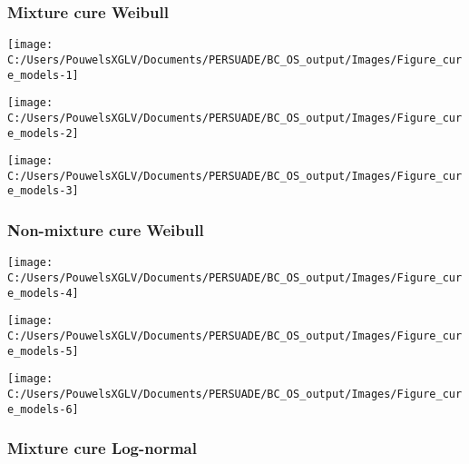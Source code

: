 \documentclass[
]{article}
\begin{document}
\clearpage

\clearpage

\subsubsection{Mixture cure Weibull}\label{mixture-cure-weibull}

\begin{flushleft}\texttt{[image: C:/Users/PouwelsXGLV/Documents/PERSUADE/BC\_OS\_output/Images/Figure\_cure\_models-1]} \end{flushleft}

\begin{flushleft}\texttt{[image: C:/Users/PouwelsXGLV/Documents/PERSUADE/BC\_OS\_output/Images/Figure\_cure\_models-2]} \end{flushleft}

\begin{flushleft}\texttt{[image: C:/Users/PouwelsXGLV/Documents/PERSUADE/BC\_OS\_output/Images/Figure\_cure\_models-3]} \end{flushleft}

\clearpage

\subsubsection{Non-mixture cure Weibull}\label{non-mixture-cure-weibull}

\begin{flushleft}\texttt{[image: C:/Users/PouwelsXGLV/Documents/PERSUADE/BC\_OS\_output/Images/Figure\_cure\_models-4]} \end{flushleft}

\begin{flushleft}\texttt{[image: C:/Users/PouwelsXGLV/Documents/PERSUADE/BC\_OS\_output/Images/Figure\_cure\_models-5]} \end{flushleft}

\begin{flushleft}\texttt{[image: C:/Users/PouwelsXGLV/Documents/PERSUADE/BC\_OS\_output/Images/Figure\_cure\_models-6]} \end{flushleft}

\clearpage

\subsubsection{Mixture cure Log-normal}\label{mixture-cure-log-normal}
\end{document}
